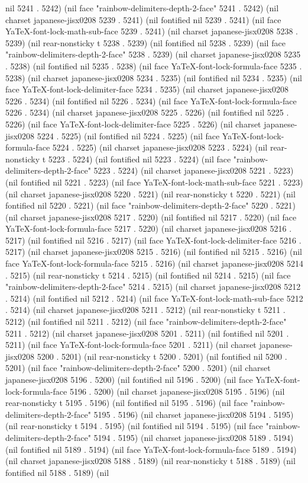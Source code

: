 nil 5241 . 5242) (nil face "rainbow-delimiters-depth-2-face" 5241 . 5242) (nil charset japanese-jisx0208 5239 . 5241) (nil fontified nil 5239 . 5241) (nil face YaTeX-font-lock-math-sub-face 5239 . 5241) (nil charset japanese-jisx0208 5238 . 5239) (nil rear-nonsticky t 5238 . 5239) (nil fontified nil 5238 . 5239) (nil face "rainbow-delimiters-depth-2-face" 5238 . 5239) (nil charset japanese-jisx0208 5235 . 5238) (nil fontified nil 5235 . 5238) (nil face YaTeX-font-lock-formula-face 5235 . 5238) (nil charset japanese-jisx0208 5234 . 5235) (nil fontified nil 5234 . 5235) (nil face YaTeX-font-lock-delimiter-face 5234 . 5235) (nil charset japanese-jisx0208 5226 . 5234) (nil fontified nil 5226 . 5234) (nil face YaTeX-font-lock-formula-face 5226 . 5234) (nil charset japanese-jisx0208 5225 . 5226) (nil fontified nil 5225 . 5226) (nil face YaTeX-font-lock-delimiter-face 5225 . 5226) (nil charset japanese-jisx0208 5224 . 5225) (nil fontified nil 5224 . 5225) (nil face YaTeX-font-lock-formula-face 5224 . 5225) (nil charset japanese-jisx0208 5223 . 5224) (nil rear-nonsticky t 5223 . 5224) (nil fontified nil 5223 . 5224) (nil face "rainbow-delimiters-depth-2-face" 5223 . 5224) (nil charset japanese-jisx0208 5221 . 5223) (nil fontified nil 5221 . 5223) (nil face YaTeX-font-lock-math-sub-face 5221 . 5223) (nil charset japanese-jisx0208 5220 . 5221) (nil rear-nonsticky t 5220 . 5221) (nil fontified nil 5220 . 5221) (nil face "rainbow-delimiters-depth-2-face" 5220 . 5221) (nil charset japanese-jisx0208 5217 . 5220) (nil fontified nil 5217 . 5220) (nil face YaTeX-font-lock-formula-face 5217 . 5220) (nil charset japanese-jisx0208 5216 . 5217) (nil fontified nil 5216 . 5217) (nil face YaTeX-font-lock-delimiter-face 5216 . 5217) (nil charset japanese-jisx0208 5215 . 5216) (nil fontified nil 5215 . 5216) (nil face YaTeX-font-lock-formula-face 5215 . 5216) (nil charset japanese-jisx0208 5214 . 5215) (nil rear-nonsticky t 5214 . 5215) (nil fontified nil 5214 . 5215) (nil face "rainbow-delimiters-depth-2-face" 5214 . 5215) (nil charset japanese-jisx0208 5212 . 5214) (nil fontified nil 5212 . 5214) (nil face YaTeX-font-lock-math-sub-face 5212 . 5214) (nil charset japanese-jisx0208 5211 . 5212) (nil rear-nonsticky t 5211 . 5212) (nil fontified nil 5211 . 5212) (nil face "rainbow-delimiters-depth-2-face" 5211 . 5212) (nil charset japanese-jisx0208 5201 . 5211) (nil fontified nil 5201 . 5211) (nil face YaTeX-font-lock-formula-face 5201 . 5211) (nil charset japanese-jisx0208 5200 . 5201) (nil rear-nonsticky t 5200 . 5201) (nil fontified nil 5200 . 5201) (nil face "rainbow-delimiters-depth-2-face" 5200 . 5201) (nil charset japanese-jisx0208 5196 . 5200) (nil fontified nil 5196 . 5200) (nil face YaTeX-font-lock-formula-face 5196 . 5200) (nil charset japanese-jisx0208 5195 . 5196) (nil rear-nonsticky t 5195 . 5196) (nil fontified nil 5195 . 5196) (nil face "rainbow-delimiters-depth-2-face" 5195 . 5196) (nil charset japanese-jisx0208 5194 . 5195) (nil rear-nonsticky t 5194 . 5195) (nil fontified nil 5194 . 5195) (nil face "rainbow-delimiters-depth-2-face" 5194 . 5195) (nil charset japanese-jisx0208 5189 . 5194) (nil fontified nil 5189 . 5194) (nil face YaTeX-font-lock-formula-face 5189 . 5194) (nil charset japanese-jisx0208 5188 . 5189) (nil rear-nonsticky t 5188 . 5189) (nil fontified nil 5188 . 5189) (nil 
